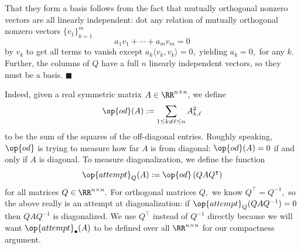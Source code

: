That they form a basis follows from the fact that mutually orthogonal nonzero vectors are all linearly independent: dot any relation of mutually orthogonal nonzero vectors $\{v_1\}_{k=1}^m$
\[a_1v_1+\cdots+a_mv_m=0\]
by $v_k$ to get all terms to vanish except $a_k\langle v_k,v_k\rangle=0,$ yielding $a_k=0,$ for any $k.$ Further, the columns of $Q$ have a full $n$ linearly independent vectors, so they must be a basis. $\blacksquare$

Indeed, given a real symmetric matrix $A\in\RR^{n\times n},$ we define
\[\op{od}(A):=\sum_{1\le k\ne\ell\le n}A_{k,\ell}^2\]
to be the sum of the squares of the off-diagonal entries. Roughly speaking, $\op{od}$ is trying to measure how far $A$ is from diagonal: $\op{od}(A)=0$ if and only if $A$ is diagonal. To measure diagonalization, we define the function
\[\op{attempt}_Q(A):=\op{od}\left(QAQ^\intercal\right)\]
for all matrices $Q\in\RR^{n\times n}.$ For orthogonal matrices $Q,$ we know $Q^\intercal=Q^{-1},$ so the above really is an attempt at diagonalization: if $\op{attempt}_Q(QAQ^{-1})=0$ then $QAQ^{-1}$ is diagonalized. We use $Q^\intercal$ instead of $Q^{-1}$ directly because we will want $\op{attempt}_\bullet(A)$ to be defined over all $\RR^{n\times n}$ for our compactness argument.

